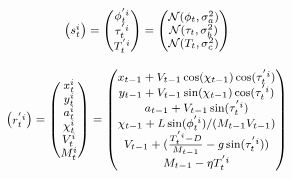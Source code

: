 \begin{equation}
\footnotesize
\begin{aligned}
  \begin{pmatrix}
    s^i_{t}    \\ 
  \end{pmatrix}
  =
  \begin{pmatrix}
  	\phi^{'i}_{t} \\
		\tau^{'i}_{t} \\
		T^{'i}_{t} \\
  \end{pmatrix}
  =
  \begin{pmatrix}
  	\mathcal{N}(\phi_{t},\sigma_a^2) \\
  	\mathcal{N}(\tau_{t},\sigma_b^2) \\
  	\mathcal{N}(T_{t},\sigma_c^2) \\
  \end{pmatrix}
\end{aligned}
\label{eq:atm_c}
\end{equation}

\begin{equation}
\footnotesize
\begin{aligned}
  \begin{pmatrix}
    r^{'i}_{t}    \\ 
  \end{pmatrix}
  =
  \begin{pmatrix}
    x^i_{t}    \\ 
    y^i_{t}    \\ 
    a^i_{t}    \\ 
    \chi^i_{t} \\ 
    V^i_{t}    \\ 
    M^i_{t}    \\ 
  \end{pmatrix}
  =
  \begin{pmatrix}
    x_{t-1}   + V_{t-1} \cos(\chi_{t-1}) \cos(\tau^{'i}_{t}) \\
    y_{t-1}   + V_{t-1} \sin(\chi_{t-1}) \cos(\tau^{'i}_{t}) \\ 
    a_{t-1}   + V_{t-1} \sin(\tau^{'i}_{t}) \\
    \chi_{t-1} + L \sin(\phi^{'i}_{t})/(M_{t-1} V_{t-1}) \\
    V_{t-1}   + (\frac{T^{'i}_{t}-D}{M_{t-1}} - g \sin(\tau^{'i}_{t})) \\
    M_{t-1}   - \eta T^{'i}_{t}  \\
  \end{pmatrix}
\end{aligned}
\label{eq:atm_s}
\end{equation}


